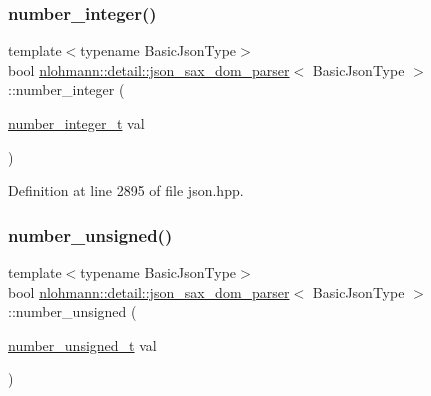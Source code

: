 \mbox{\label{classnlohmann_1_1detail_1_1json__sax__dom__parser_aff77f861ba336df48c9786a993941397}} 
\subsubsection{\texorpdfstring{number\_integer()}{number\_integer()}}
{\footnotesize\ttfamily template$<$typename Basic\+Json\+Type$>$ \\
bool \mbox{\hyperlink{classnlohmann_1_1detail_1_1json__sax__dom__parser}{nlohmann\+::detail\+::json\+\_\+sax\+\_\+dom\+\_\+parser}}$<$ Basic\+Json\+Type $>$\+::number\+\_\+integer (\begin{DoxyParamCaption}\item[{\mbox{\hyperlink{classnlohmann_1_1detail_1_1json__sax__dom__parser_a3d5cd67d179aa7422ce90e54984a441e}{number\+\_\+integer\+\_\+t}}}]{val }\end{DoxyParamCaption})\hspace{0.3cm}{\ttfamily [inline]}}



Definition at line 2895 of file json.\+hpp.

\mbox{\label{classnlohmann_1_1detail_1_1json__sax__dom__parser_a2b4ff5146ed46993527e4a67d99c1355}} 
\subsubsection{\texorpdfstring{number\_unsigned()}{number\_unsigned()}}
{\footnotesize\ttfamily template$<$typename Basic\+Json\+Type$>$ \\
bool \mbox{\hyperlink{classnlohmann_1_1detail_1_1json__sax__dom__parser}{nlohmann\+::detail\+::json\+\_\+sax\+\_\+dom\+\_\+parser}}$<$ Basic\+Json\+Type $>$\+::number\+\_\+unsigned (\begin{DoxyParamCaption}\item[{\mbox{\hyperlink{classnlohmann_1_1detail_1_1json__sax__dom__parser_a90f19b272530a479db81db11be2ea15c}{number\+\_\+unsigned\+\_\+t}}}]{val }\end{DoxyParamCaption})\hspace{0.3cm}{\ttfamily [inline]}}



